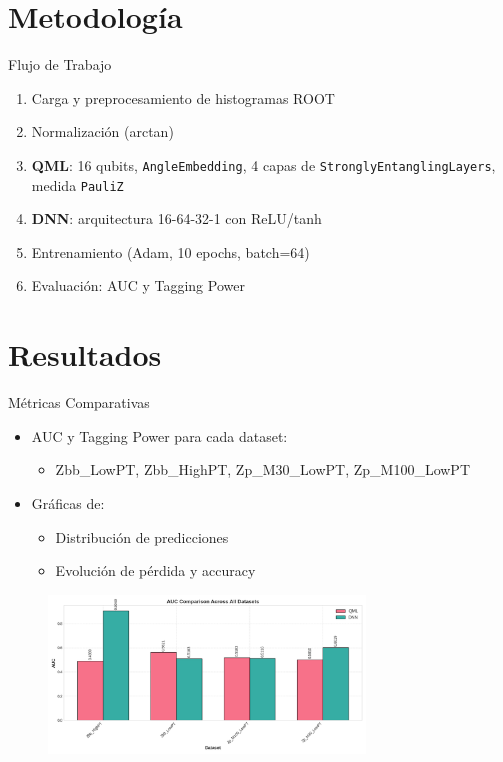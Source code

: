 \documentclass{beamer}
\begin{document}
\section{Metodología}
\begin{frame}{Flujo de Trabajo}
  \begin{enumerate}
    \item Carga y preprocesamiento de histogramas ROOT
    \item Normalización (arctan)
    \item \textbf{QML}: 16 qubits, \texttt{AngleEmbedding}, 4 capas de \texttt{StronglyEntanglingLayers}, medida \texttt{PauliZ}
    \item \textbf{DNN}: arquitectura 16-64-32-1 con ReLU/tanh
    \item Entrenamiento (Adam, 10 epochs, batch=64)
    \item Evaluación: AUC y Tagging Power
  \end{enumerate}
\end{frame}

\section{Resultados}
\begin{frame}{Métricas Comparativas}
  \begin{itemize}
    \item AUC y Tagging Power para cada dataset:
      \begin{itemize}
        \item Zbb\_LowPT, Zbb\_HighPT, Zp\_M30\_LowPT, Zp\_M100\_LowPT
      \end{itemize}
    \item Gráficas de:
      \begin{itemize}
        \item Distribución de predicciones
        \item Evolución de pérdida y accuracy
      \end{itemize}
  \end{itemize}
  \vspace{1em}
  \begin{figure}
    \centering
    \includegraphics[width=0.75\textwidth]{resumen_hmmm/auc_all_datasets.png}
  \end{figure}
\end{frame}
\end{document}
